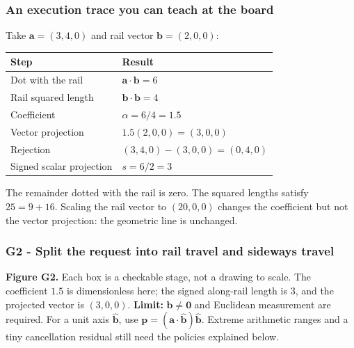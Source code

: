 \subsubsection{An execution trace you can teach at the board}\label{01-foundations-i-ch017-an-execution-trace-you-can-teach-at-the-board}

\hypertarget{01-foundations-i-ch017-an-execution-trace-you-can-teach-at-the-board}{}

Take \(\mathbf a=(3,4,0)\) and rail vector \(\mathbf b=(2,0,0)\):

{\def\LTcaptype{none} %
\begin{longtable}[]{@{}ll@{}}
\toprule\noalign{}
Step & Result \\
\midrule\noalign{}
\endhead
\bottomrule\noalign{}
\endlastfoot
Dot with the rail & \(\mathbf a\cdot\mathbf b=6\) \\
Rail squared length & \(\mathbf b\cdot\mathbf b=4\) \\
Coefficient & \(\alpha=6/4=1.5\) \\
Vector projection & \(1.5(2,0,0)=(3,0,0)\) \\
Rejection & \((3,4,0)-(3,0,0)=(0,4,0)\) \\
Signed scalar projection & \(s=6/2=3\) \\
\end{longtable}
}

The remainder dotted with the rail is zero. The squared lengths satisfy \(25=9+16\). Scaling the rail vector to \((20,0,0)\) changes the coefficient but not the vector projection: the geometric line is unchanged.

\subsubsection{G2 - Split the request into rail travel and sideways travel}\label{01-foundations-i-ch017-g2---split-the-request-into-rail-travel-and-sideways-travel}

\hypertarget{01-foundations-i-ch017-g2---split-the-request-into-rail-travel-and-sideways-travel}{}


\textbf{Figure G2.} Each box is a checkable stage, not a drawing to scale. The coefficient \(1.5\) is dimensionless here; the signed along-rail length is \(3\), and the projected vector is \((3,0,0)\). \textbf{Limit:} \(\mathbf b\ne\mathbf0\) and Euclidean measurement are required. For a unit axis \(\widehat{\mathbf b}\), use \(\mathbf p=(\mathbf a\cdot\widehat{\mathbf b})\widehat{\mathbf b}\). Extreme arithmetic ranges and a tiny cancellation residual still need the policies explained below.

